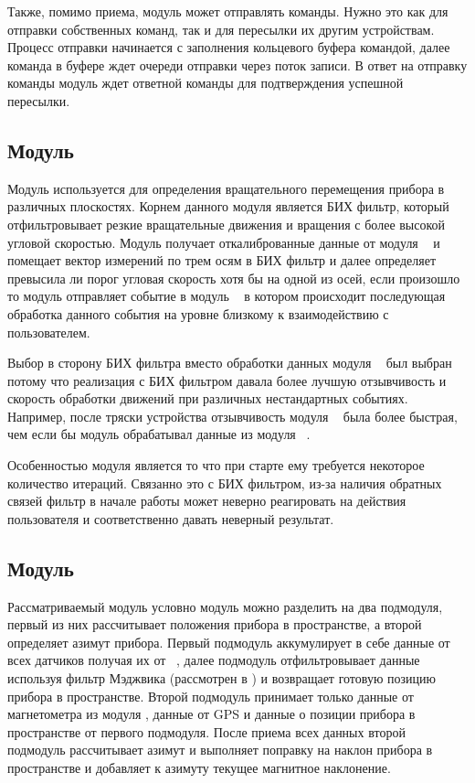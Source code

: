 Также, помимо приема, модуль может отправлять команды. Нужно это как для отправки собственных команд, так и для пересылки их другим устройствам.
Процесс отправки начинается с заполнения кольцевого буфера командой, далее команда в буфере ждет очереди отправки через поток записи. В ответ на отправку
команды модуль ждет ответной команды для подтверждения успешной пересылки.


\subsection{Модуль \moduleMoveDetect}

Модуль используется для определения вращательного перемещения прибора в различных плоскостях. Корнем данного модуля является
БИХ фильтр, который отфильтровывает резкие вращательные движения и вращения с более высокой угловой скоростью.
Модуль получает откалиброванные данные от модуля \moduleCalib~ и помещает вектор измерений по трем осям в БИХ фильтр
и далее определяет превысила ли порог угловая скорость хотя бы на одной из осей, если произошло то модуль отправляет событие 
в модуль \moduleGraphics~ в котором происходит последующая обработка данного события на уровне близкому к взаимодействию с пользователем.

Выбор в сторону БИХ фильтра вместо обработки данных модуля \moduleOrientationAzimuth~ был выбран потому что реализация 
с БИХ фильтром давала более лучшую отзывчивость и скорость обработки движений при различных нестандартных событиях.
Например, после тряски устройства отзывчивость модуля \moduleMoveDetect~ была более быстрая, чем если бы модуль обрабатывал
данные из модуля \moduleOrientationAzimuth~. 

Особенностью модуля является то что при старте ему требуется некоторое количество итераций. Связанно это с БИХ фильтром, из-за наличия
обратных связей фильтр в начале работы может неверно реагировать на действия пользователя и соответственно давать неверный результат.

\subsection{Модуль \moduleOrientationAzimuth}

Рассматриваемый модуль условно модуль можно разделить на два подмодуля, первый из них рассчитывает положения прибора в пространстве,
а второй определяет азимут прибора. Первый подмодуль аккумулирует в себе данные от всех датчиков получая их от \moduleCalib~, 
далее подмодуль отфильтровывает данные используя фильтр Мэджвика (рассмотрен в ) и возвращает готовую позицию прибора в пространстве.
Второй подмодуль принимает только данные от магнетометра из модуля \moduleCalib, данные от GPS и данные о позиции прибора в пространстве
от первого подмодуля.
После приема всех данных второй подмодуль рассчитывает азимут и выполняет поправку на наклон прибора в 
пространстве и добавляет к азимуту текущее магнитное наклонение.

